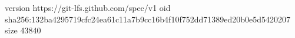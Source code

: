 version https://git-lfs.github.com/spec/v1
oid sha256:132ba4295719cfc24ea61c11a7b9cc16b4f10f752dd71389ed20b0e5d5420207
size 43840
